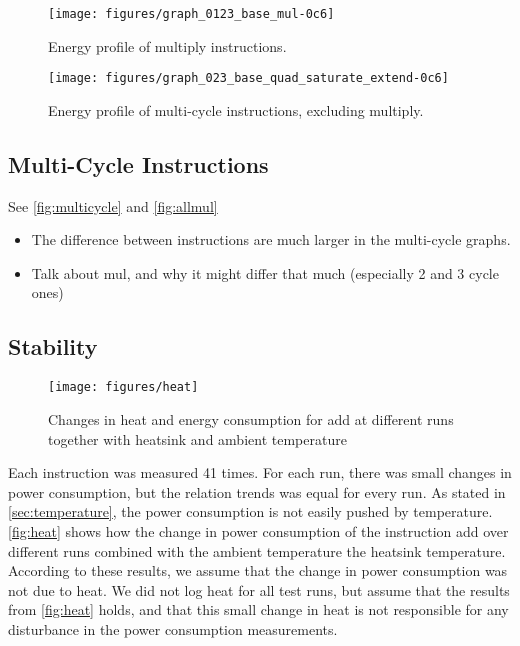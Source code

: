 \begin{figure*}
    \centering
    \texttt{[image: figures/graph\_0123\_base\_mul-0c6]}
    \caption{Energy profile of multiply instructions.}
    \label{fig:allmul}
\end{figure*}

\begin{figure}
    \centering
    \texttt{[image: figures/graph\_023\_base\_quad\_saturate\_extend-0c6]}
    \caption{Energy profile of multi-cycle instructions, excluding multiply.}
    \label{fig:multicycle}
\end{figure}


\subsection{Multi-Cycle Instructions}

See \autoref{fig:multicycle} and \autoref{fig:allmul}
\begin{itemize}
    \item The difference between instructions are much larger in the multi-cycle
        graphs.
    \item Talk about mul, and why it might differ that much (especially 2 and 3 cycle ones)
\end{itemize}

\subsection{Stability}
\begin{figure}
    \centering
    \texttt{[image: figures/heat]}
    \caption{Changes in heat and energy consumption for {\ttfamily add} at different runs together with heatsink and ambient temperature}
    \label{fig:heat}
\end{figure}

Each instruction was measured 41 times. For each run, there was small changes in
power consumption, but the relation trends was equal for every run.
As stated in \autoref{sec:temperature}, the power consumption is not easily pushed by temperature. \autoref{fig:heat} shows how the change in power consumption of the instruction
{\ttfamily add} over different runs combined with the ambient temperature the
heatsink temperature. According to these results, we assume that the change in
power consumption was not due to heat. We did not log heat for all test runs,
but assume that the results from \autoref{fig:heat} holds, and that this small
change in heat is not responsible for any disturbance in the power consumption
measurements.


